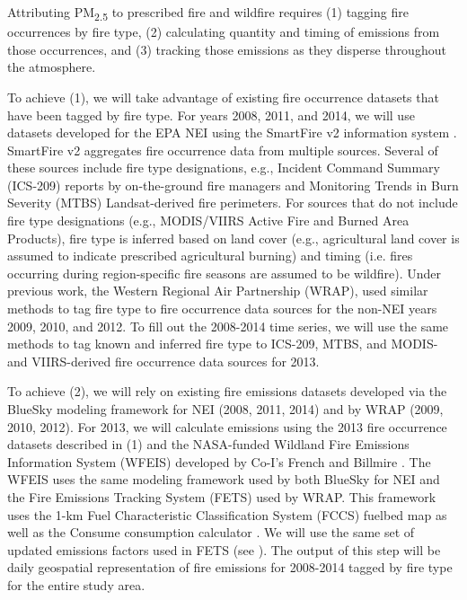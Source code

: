 \documentclass[authoryear]{elsarticle}
\begin{document}
Attributing PM\textsubscript{2.5} to prescribed fire and wildfire 
requires (1) tagging fire occurrences by fire type, (2) calculating quantity and timing of emissions from those occurrences, and (3) tracking those emissions as they disperse throughout the atmosphere.

To achieve (1), we will take advantage of existing fire occurrence datasets that have been tagged by fire type. For years 2008, 2011, and 2014, we will use datasets developed for the EPA NEI using the SmartFire v2 information system \citep{SmartFire2017,Raffuse2009}. SmartFire v2 aggregates fire occurrence data from multiple sources. Several of these sources include fire type designations, e.g., Incident Command Summary (ICS-209) reports by on-the-ground fire managers and Monitoring Trends in Burn Severity (MTBS) \citep{ICS2017,Eidenshink2007} Landsat-derived fire perimeters. For sources that do not include fire type designations (e.g., MODIS/VIIRS Active Fire and Burned Area Products), fire type is inferred based on land cover (e.g., agricultural land cover is assumed to indicate prescribed agricultural burning) and timing (i.e. fires occurring during region-specific fire seasons are assumed to be wildfire).  Under previous work, the Western Regional Air Partnership (WRAP), used similar methods to tag fire type to fire occurrence data sources for the non-NEI years 2009, 2010, and 2012. To fill out the 2008-2014 time series, we will use the same methods to tag known and inferred fire type to ICS-209, MTBS, and MODIS- and VIIRS-derived fire occurrence data sources for 2013.

To achieve (2), we will rely on existing fire emissions datasets developed via the BlueSky \citep{BlueSky2017} modeling framework for NEI (2008, 2011, 2014) and by WRAP (2009, 2010, 2012). For 2013, we will calculate emissions using the 2013 fire occurrence datasets described in (1) and the NASA-funded Wildland Fire Emissions Information System (WFEIS) \citep{WFEIS2017} developed by Co-I's French and Billmire \citep{French2014}. The WFEIS uses the same modeling framework used by both BlueSky for NEI and the Fire Emissions Tracking System (FETS) \citep{FETS2017} used by WRAP. This framework uses the 1-km Fuel Characteristic Classification System (FCCS) \citep{Ottmar2007} fuelbed map as well as the Consume consumption calculator \citep{Prichard2009}. We will use the same set of updated emissions factors used in FETS (see \cite{PMDETAIL2017}). The output of this step will be daily geospatial representation of fire emissions for 2008-2014 tagged by fire type for the entire study area.
\end{document}
